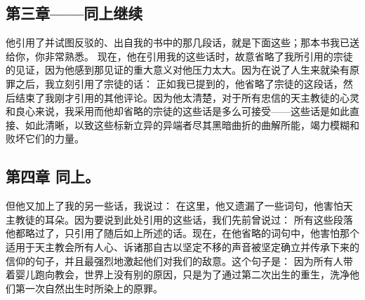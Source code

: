 
\subsection{第三章——同上继续}

他引用了并试图反驳的、出自我的书中的那几段话，就是下面这些；那本书我已送给你，你非常熟悉。  现在，他在引用我的这些话时，故意省略了我所引用的宗徒的见证，因为他感到那见证的重大意义对他压力太大。因为在说了人生来就染有原罪之后，我立刻引用了宗徒的话： 正如我已提到的，他省略了宗徒的这段话，然后结束了我刚才引用的其他评论。因为他太清楚，对于所有忠信的天主教徒的心灵和良心来说，我采用而他却省略的宗徒的这些话是多么可接受——这些话是如此直接、如此清晰，以致这些标新立异的异端者尽其黑暗曲折的曲解所能，竭力模糊和败坏它们的力量。\par


\subsection{第四章 同上。}

但他又加上了我的另一些话，我说过： 在这里，他又遗漏了一些词句，他害怕天主教徒的耳朵。因为要说到此处引用的这些话，我们先前曾说过： 所有这些段落他都略过了，只引用了随后如上所述的话。现在，在他省略的词句中，他害怕那个适用于天主教会所有人心、诉诸那自古以坚定不移的声音被坚定确立并传承下来的信仰的句子，并且最强烈地激起他们对我们的敌意。这个句子是： 因为所有人带着婴儿跑向教会，世界上没有别的原因，只是为了通过第二次出生的重生，洗净他们第一次自然出生时所染上的原罪。\par

